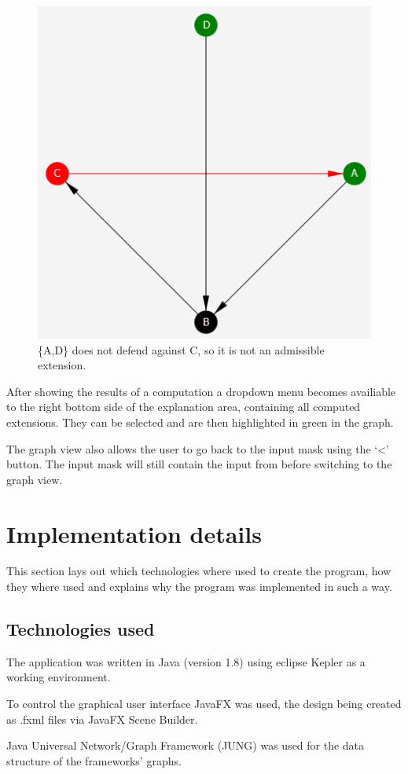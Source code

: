 \documentclass[draft,final]{vutinfth} %
\newcommand{\hl}{\par\vspace{6pt}} %
\newcommand{\cl}{\par\vspace{12pt}} %
\begin{document}
\FloatBarrier
	\begin{figure}[!h]
		\centering
		\includegraphics{pics/colored.png}
		\caption{\{A,D\} does not defend against C, so it is not an admissible extension.}
	\end{figure}
\FloatBarrier

After showing the results of a computation a dropdown menu becomes availiable to the right bottom side of the explanation area, containing all computed extensions. They can be selected and are then highlighted in green in the graph.\hl
The graph view also allows the user to go back to the input mask using the `<' button. The input mask will still contain the input from before switching to the graph view.

\section{Implementation details}
This section lays out which technologies where used to create the program, how they where used and explains why the program was implemented in such a way.\cl %

\subsection{Technologies used}
The application was written in Java (version 1.8) using eclipse Kepler as a working environment.\hl
To control the graphical user interface JavaFX was used, the design being created as .fxml files via JavaFX Scene Builder.\hl
Java Universal Network/Graph Framework (JUNG) was used for the data structure of the frameworks' graphs.
\end{document}
